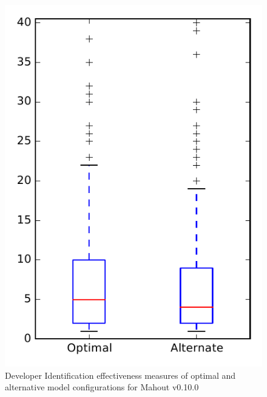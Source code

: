 
\begin{figure}
\centering
\includegraphics[height=0.4\textheight]{figures/combo/dit_rq1_mahout}
\caption{Developer Identification effectiveness measures of optimal and alternative model configurations for Mahout v0.10.0}
\label{fig:combo:dit:rq1:mahout}
\end{figure}
